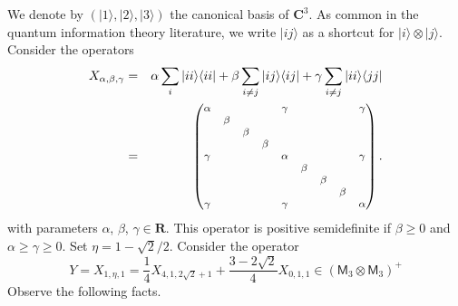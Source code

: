 \documentclass{amsart}
\renewcommand{\geq}{\geqslant}
\newcommand{\R}{\mathbf{R}}
\newcommand{\CC}{\mathbf{C}}
\newcommand{\ketbra}[2]{| #1 \rangle \langle  #2 |}
\newcommand{\M}{\mathsf{M}}
\newcommand{\ket}[1]{| #1 \rangle}
\theoremstyle{plain}
\begin{document}
We denote by $(\ket{1},\ket{2},\ket{3})$ the canonical basis of $\CC^3$. As common in the quantum information theory literature, we write $\ket{ij}$ as a shortcut for $\ket{i} \otimes \ket{j}$. Consider the operators 
\begin{eqnarray*} X_{\alpha,\beta,\gamma} 
&= &\alpha \sum_i \ketbra{ii}{ii} + \beta \sum_{i\neq j} \ketbra{ij}{ij} + \gamma \sum_{i \neq j} \ketbra{ii}{jj} \\
& = & { \footnotesize\begin{pmatrix} 
\alpha & & & & \gamma & & & & \gamma \\
& \beta & & & & & & & \\
& & \beta & & & & & & \\
& & & \beta & & & & & \\
\gamma & & & & \alpha & & & & \gamma \\
& & & & & \beta & & & \\
& & & & & & \beta & & \\
& & & & & & & \beta & \\
\gamma & & & & \gamma & & & & \alpha 
\end{pmatrix}.}
\end{eqnarray*}
with parameters $\alpha$, $\beta$, $\gamma\in \R$.
This operator is positive semidefinite if $\beta \geq 0$ and $\alpha \geq \gamma \geq 0$. Set $\eta = 1-\sqrt{2}/2$. Consider the operator
\[ Y = X_{1,\eta,1} = \frac{1}{4} X_{4,1,2\sqrt{2}+1} + \frac{3-2\sqrt{2}}{4} X_{0,1,1}\in (\M_3\otimes \M_3)^+
\]
Observe the following facts.
\end{document}
